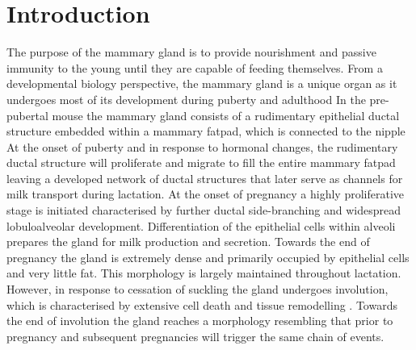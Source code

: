 \documentclass[titlepage, 12pt, oneside]{amsart}
\begin{document}
\section{Introduction}
The purpose of the mammary gland is to provide nourishment and passive immunity to the young until they are capable of feeding themselves.
From a developmental biology perspective, the mammary gland is a unique organ as it undergoes most of its development during puberty and adulthood\autocite{Watson2008,Hennighausen2005,Hennighausen1998,Inman2015}
In the pre-pubertal mouse the mammary gland consists of a rudimentary epithelial ductal structure embedded within a mammary fatpad, which is connected to the nipple\autocite{Mikkola2006,Hens2005}
At the onset of puberty and in response to hormonal changes, the rudimentary ductal structure will proliferate and migrate to fill the entire mammary fatpad leaving a developed network of ductal structures that later serve as channels for milk transport during lactation.
At the onset of pregnancy a highly proliferative stage is initiated characterised by further ductal side-branching and widespread lobuloalveolar development\autocite{Watson2008}.
Differentiation of the epithelial cells within alveoli prepares the gland for milk production and secretion.
Towards the end of pregnancy the gland is extremely dense and primarily occupied by epithelial cells and very little fat.
This morphology is largely maintained throughout lactation.
However, in response to cessation of suckling the gland undergoes involution, which is characterised by extensive cell death and tissue remodelling \autocite{Inman2015,Watson2006} .
Towards the end of involution the gland reaches a morphology resembling that prior to pregnancy and subsequent pregnancies will trigger the same chain of events.
\end{document}
